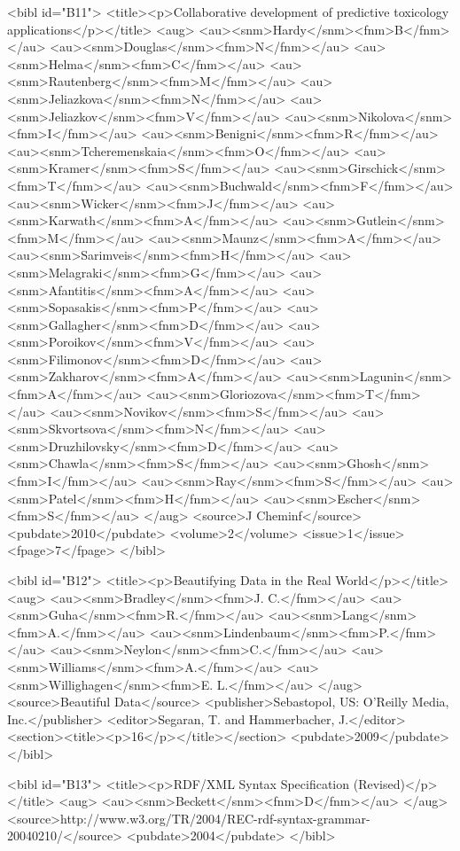 \documentclass[10pt]{bmc_article}
\newenvironment{bmcformat}{\begin{raggedright}\baselineskip20pt\sloppy\setboolean{publ}{false}}{\end{raggedright}\baselineskip20pt\sloppy}
\begin{document}
\begin{bmcformat}
{<bibl id="B11">
  <title><p>Collaborative development of predictive toxicology
  applications</p></title>
  <aug>
    <au><snm>Hardy</snm><fnm>B</fnm></au>
    <au><snm>Douglas</snm><fnm>N</fnm></au>
    <au><snm>Helma</snm><fnm>C</fnm></au>
    <au><snm>Rautenberg</snm><fnm>M</fnm></au>
    <au><snm>Jeliazkova</snm><fnm>N</fnm></au>
    <au><snm>Jeliazkov</snm><fnm>V</fnm></au>
    <au><snm>Nikolova</snm><fnm>I</fnm></au>
    <au><snm>Benigni</snm><fnm>R</fnm></au>
    <au><snm>Tcheremenskaia</snm><fnm>O</fnm></au>
    <au><snm>Kramer</snm><fnm>S</fnm></au>
    <au><snm>Girschick</snm><fnm>T</fnm></au>
    <au><snm>Buchwald</snm><fnm>F</fnm></au>
    <au><snm>Wicker</snm><fnm>J</fnm></au>
    <au><snm>Karwath</snm><fnm>A</fnm></au>
    <au><snm>Gutlein</snm><fnm>M</fnm></au>
    <au><snm>Maunz</snm><fnm>A</fnm></au>
    <au><snm>Sarimveis</snm><fnm>H</fnm></au>
    <au><snm>Melagraki</snm><fnm>G</fnm></au>
    <au><snm>Afantitis</snm><fnm>A</fnm></au>
    <au><snm>Sopasakis</snm><fnm>P</fnm></au>
    <au><snm>Gallagher</snm><fnm>D</fnm></au>
    <au><snm>Poroikov</snm><fnm>V</fnm></au>
    <au><snm>Filimonov</snm><fnm>D</fnm></au>
    <au><snm>Zakharov</snm><fnm>A</fnm></au>
    <au><snm>Lagunin</snm><fnm>A</fnm></au>
    <au><snm>Gloriozova</snm><fnm>T</fnm></au>
    <au><snm>Novikov</snm><fnm>S</fnm></au>
    <au><snm>Skvortsova</snm><fnm>N</fnm></au>
    <au><snm>Druzhilovsky</snm><fnm>D</fnm></au>
    <au><snm>Chawla</snm><fnm>S</fnm></au>
    <au><snm>Ghosh</snm><fnm>I</fnm></au>
    <au><snm>Ray</snm><fnm>S</fnm></au>
    <au><snm>Patel</snm><fnm>H</fnm></au>
    <au><snm>Escher</snm><fnm>S</fnm></au>
  </aug>
  <source>J Cheminf</source>
  <pubdate>2010</pubdate>
  <volume>2</volume>
  <issue>1</issue>
  <fpage>7</fpage>
</bibl>

<bibl id="B12">
  <title><p>Beautifying Data in the Real World</p></title>
  <aug>
    <au><snm>Bradley</snm><fnm>J. C.</fnm></au>
    <au><snm>Guha</snm><fnm>R.</fnm></au>
    <au><snm>Lang</snm><fnm>A.</fnm></au>
    <au><snm>Lindenbaum</snm><fnm>P.</fnm></au>
    <au><snm>Neylon</snm><fnm>C.</fnm></au>
    <au><snm>Williams</snm><fnm>A.</fnm></au>
    <au><snm>Willighagen</snm><fnm>E. L.</fnm></au>
  </aug>
  <source>Beautiful Data</source>
  <publisher>Sebastopol, US: O'Reilly Media, Inc.</publisher>
  <editor>Segaran, T. and Hammerbacher, J.</editor>
  <section><title><p>16</p></title></section>
  <pubdate>2009</pubdate>
</bibl>

<bibl id="B13">
  <title><p>{RDF}/XML Syntax Specification (Revised)</p></title>
  <aug>
    <au><snm>Beckett</snm><fnm>D</fnm></au>
  </aug>
  <source>http://www.w3.org/TR/2004/REC-rdf-syntax-grammar-20040210/</source>
  <pubdate>2004</pubdate>
</bibl>

}
\end{bmcformat}
\end{document}
